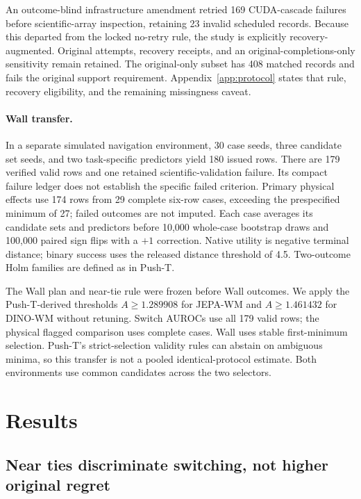 \documentclass{article}
\begin{document}
An outcome-blind infrastructure amendment retried 169 CUDA-cascade failures
before scientific-array inspection, retaining 23 invalid scheduled records.
Because this departed from the locked no-retry rule, the study is explicitly
recovery-augmented. Original attempts, recovery receipts, and an
original-completions-only sensitivity remain retained. The original-only subset
has 408 matched records and fails the original support requirement. Appendix~\ref{app:protocol}
states that rule, recovery eligibility, and the remaining missingness caveat.

\paragraph{Wall transfer.}
In a separate simulated navigation environment, 30 case seeds, three candidate set
seeds, and two task-specific predictors yield 180 issued rows. There are
179 verified valid rows and one retained scientific-validation failure. Its
compact failure ledger does not establish the specific failed criterion. Primary
physical effects use 174 rows from 29 complete six-row cases, exceeding the
prespecified minimum of 27; failed outcomes are not imputed. Each case
averages its candidate sets and predictors before 10,000 whole-case bootstrap draws
and 100,000 paired sign flips with a $+1$ correction. Native utility is
negative terminal distance; binary success uses the released distance
threshold of 4.5. Two-outcome Holm families are defined as in Push-T.

The Wall plan and near-tie rule were frozen before Wall outcomes. We apply
the Push-T-derived thresholds $A\ge1.289908$ for JEPA-WM and
$A\ge1.461432$ for DINO-WM without retuning. Switch AUROCs use all 179 valid
rows; the physical flagged comparison uses complete cases. Wall uses stable
first-minimum selection. Push-T's strict-selection validity rules can abstain
on ambiguous minima, so this transfer is not a pooled identical-protocol
estimate. Both environments use common candidates across the two selectors.

\section{Results}

\subsection{Near ties discriminate switching, not higher original regret}
\end{document}
